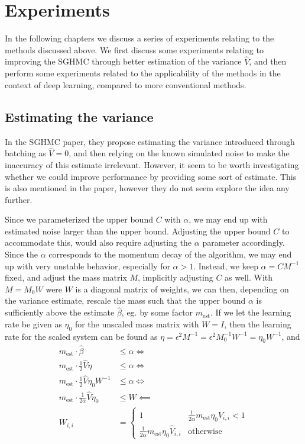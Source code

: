 \chapter{Experiments}

In the following chapters we discuss a series of experiments relating to the methods discussed above. 
We first discuss some experiments relating to improving the SGHMC through better estimation of the variance $\hat{V}$, and then perform some experiments related to the applicability of the methods in the context of deep learning, compared to more conventional methods.

\section{Estimating the variance}

In the SGHMC paper, they propose estimating the variance introduced through batching as $\hat{V}=0$, and then relying on the known simulated noise to make the inaccuracy of this estimate irrelevant. 
However, it seem to be worth investigating whether we could improve performance by providing some sort of estimate. 
This is also mentioned in the paper, however they do not seem explore the idea any further. 

Since we parameterized the upper bound $C$ with $\alpha$, we may end up with estimated noise larger than the upper bound.
Adjusting the upper bound $C$ to accommodate this, would also require adjusting the $\alpha$ parameter accordingly.
Since the $\alpha$ corresponds to the momentum decay of the algorithm, we may end up with very unstable behavior, especially for $\alpha > 1$. 
Instead, we keep $\alpha=CM^{-1}$ fixed, and adjust the mass matrix $M$, implicitly adjusting $C$ as well.
With $M = M_0 W$ were $W$ is a diagonal matrix of weights, we can then, depending on the variance estimate, rescale the mass such that the upper bound $\alpha$ is sufficiently above the estimate $\hat\beta$, eg. by some factor $m_{\text{est}}$.
If we let the learning rate be given as $\eta_0$  for the unscaled mass matrix with $W = I$, then the learning rate for the scaled system can be found as $\eta = \epsilon^2 M^{-1} = \epsilon^2 M_0^{-1}W^{-1} = \eta_0 W^{-1}$, and
\begin{align}
    m_{\text{est}} \cdot \hat{\beta}  &\leq \alpha \Leftrightarrow\\ 
    m_{\text{est}} \cdot \frac{1}{2} \hat V \eta   &\leq \alpha \Leftrightarrow\\ 
    m_{\text{est}} \cdot \frac{1}{2} \hat V \eta_0 W^{-1}  &\leq \alpha \Leftrightarrow\\ 
    m_{\text{est}} \cdot \frac{1}{2\alpha} \hat V \eta_0   &\leq W \impliedby \\
    W_{i,i} &= \begin{cases}
        1 & \frac{1}{2\alpha}m_{\text{est}} \eta_0 \hat{V}_{i,i} < 1 \\
        \frac{1}{2\alpha}m_{\text{est}} \eta_0 \hat{V}_{i,i} & \text{otherwise}
    \end{cases}
\end{align}

